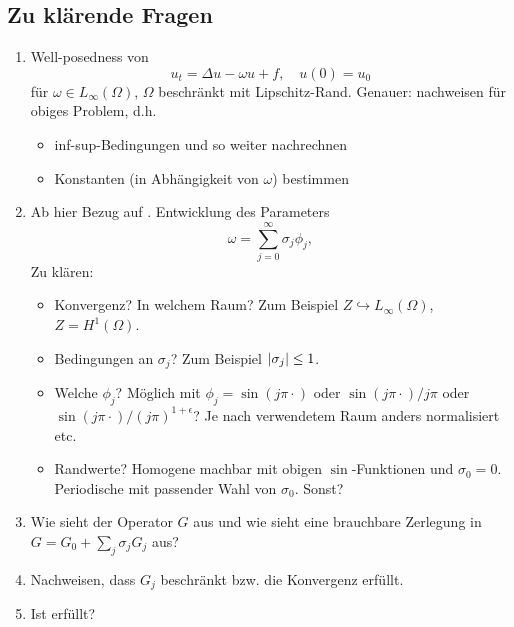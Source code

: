 
\subsection{Zu klärende Fragen} %
\label{sub:zu_kl_rende_fragen}

\begin{enumerate}
    \item Well-posedness von
    \begin{equation}
        u_{t} = \Delta u - \omega u + f, \quad u(0) = u_{0}
    \end{equation}
    für $\omega \in L_{\infty}(\Omega)$, $\Omega$ beschränkt mit Lipschitz-Rand.
    Genauer: \cite[Theorem 5.1]{Schwab:2009ec}  nachweisen für obiges Problem, d.h.
    \begin{itemize}
        \item inf-sup-Bedingungen und so weiter nachrechnen
        \item Konstanten (in Abhängigkeit von $\omega$) bestimmen
    \end{itemize}
    \item Ab hier Bezug auf \cite{Kunoth:2013ef}. Entwicklung des Parameters
    \begin{equation}
        \omega = \sum_{j = 0}^{\infty} \sigma_{j} \phi_{j},
    \end{equation}
    Zu klären:
    \begin{itemize}
        \item Konvergenz? In welchem Raum? Zum Beispiel $Z \hookrightarrow L_{\infty}(\Omega)$, $Z = H^{1}(\Omega)$.
        \item Bedingungen an $\sigma_{j}$? Zum Beispiel $\lvert\sigma_{j}\rvert \leq 1$.
        \item Welche $\phi_{j}$? Möglich mit $\phi_{j} = \sin(j \pi \cdot)$ oder $\sin(j \pi \cdot) / j \pi$ oder $\sin(j \pi \cdot) / (j \pi)^{1 + \epsilon}$? Je nach verwendetem Raum anders normalisiert etc.
        \item Randwerte? Homogene machbar mit obigen $\sin$-Funktionen und $\sigma_{0} = 0$. Periodische mit passender Wahl von $\sigma_{0}$. Sonst?
    \end{itemize}
    \item Wie sieht der Operator $G$ aus und wie sieht eine brauchbare Zerlegung in $G = G_{0} + \sum_{j} \sigma_{j} G_{j}$ aus?
    \item Nachweisen, dass $G_{j}$ beschränkt bzw. die Konvergenz erfüllt.
    \item Ist \cite[Assumption 2]{Kunoth:2013ef} erfüllt?
\end{enumerate}

